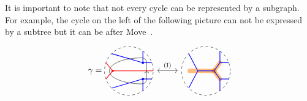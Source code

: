 \begin{remark}
It is important to note that not every cycle can be represented by a subgraph. For example, the cycle on the left of the following picture can not be expressed by a subtree but it can be after Move~.
\[
\begin{tikzcd}
\cycle=\begin{tikzpicture}[baseline=-.5ex,scale=0.667]
\draw [dashed] (0,0) circle [radius=1.5];%

\draw [blue, thick] ({-1.5*sqrt(2)/2},{1.5*sqrt(2)/2})--({sqrt(3)/2},1/2);
\draw [blue, thick] ({-1.5*sqrt(2)/2},{-1.5*sqrt(2)/2})--({sqrt(3)/2},-1/2);

\draw [blue, thick] ({sqrt(3)/2},1/2)--({sqrt(2)},1/2);
\draw [blue, thick] ({sqrt(3)/2},-1/2)--({sqrt(2)},-1/2);
\draw [blue, thick] ({sqrt(3)/2},1/2)--({sqrt(3)/2},{sqrt(6)/2});
\draw [blue, thick] ({sqrt(3)/2},-1/2)--({sqrt(3)/2},{-sqrt(6)/2});

\draw [red,thick] ({-1.5*2*sqrt(2)/3},{1.5*1/3}) to (-1,0);
\draw [red,thick] ({-1.5*2*sqrt(2)/3},{-1.5*1/3}) to (-1,0);
\draw [red, thick] (-1,0)--(1.5,0);

\draw[thick,red,fill=red] (-1,0) circle (0.05);
\draw[thick,blue,fill=blue] ({sqrt(3)/2},1/2) circle (0.05);
\draw[thick,blue,fill=blue] ({sqrt(3)/2},-1/2) circle (0.05);

\draw[->] (-1.2,0) arc (180:270:2 and 0.8) arc (-90:0:0.3) -- ++(0,0.5);
\draw (-1.2,0) arc (180:90:2 and 0.8) arc (90:0:0.3) -- ++(0,-0.5);
\end{tikzpicture}
\arrow[leftrightarrow, r, "\Move{I}"]&
\begin{tikzpicture}[baseline=-.5ex,scale=0.667]
\begin{scope}%
\draw [dashed] (0,0) circle [radius=1.5];%
\draw [color=cyclecolor1, line cap=round, line width=5, opacity=0.5] (-1,0) to (0.5,0);
\draw [color=cyclecolor1, line cap=round, line width=5, opacity=0.5] ({sqrt(3)/2},1/2)--(1/2,0);
\draw [color=cyclecolor1, line cap=round, line width=5, opacity=0.5] ({sqrt(3)/2},-1/2)--(1/2,0);

\draw [blue, thick] ({-1.5*sqrt(2)/2},{1.5*sqrt(2)/2})--(-1/2,0);
\draw [blue, thick] ({-1.5*sqrt(2)/2},{-1.5*sqrt(2)/2})--(-1/2,0);
\draw [blue, thick] ({sqrt(3)/2},1/2)--(1/2,0);
\draw [blue, thick] ({sqrt(3)/2},-1/2)--(1/2,0);
\draw [blue, thick] ({sqrt(3)/2},1/2)--({sqrt(2)},1/2);
\draw [blue, thick] ({sqrt(3)/2},-1/2)--({sqrt(2)},-1/2);
\draw [blue, thick] ({sqrt(3)/2},1/2)--({sqrt(3)/2},{sqrt(6)/2});
\draw [blue, thick] ({sqrt(3)/2},-1/2)--({sqrt(3)/2},{-sqrt(6)/2});
\draw [blue, thick] (-1/2,0)--(1/2,0);


\end{scope}
\end{tikzpicture}
\end{tikzcd}\]
\end{remark}
